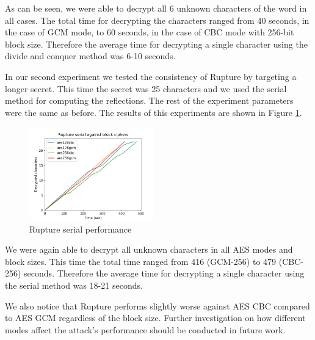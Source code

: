 As can be seen, we were able to decrypt all 6 unknown characters of the word in
all cases. The total time for decrypting the characters ranged from 40 seconds,
in the case of GCM mode, to 60 seconds, in the case of CBC mode with 256-bit
block size. Therefore the average time for decrypting a single character using
the divide and conquer method was 6-10 seconds.

In our second experiment we tested the consistency of Rupture by targeting a
longer secret. This time the secret was 25 characters and we used the
serial method for computing the reflections. The rest of the experiment
parameters were the same as before. The results of this experiments are shown in
Figure \ref{fig:rupture_performance_serial}.

   \begin{figure}[thpb]
      \centering
          \includegraphics[width=0.48\textwidth]{experiments/rupture_performance/rupture_serial_performance.png}
      \caption{Rupture serial performance}
      \label{fig:rupture_performance_serial}
   \end{figure}

We were again able to decrypt all unknown characters in all AES modes and block
sizes. This time the total time ranged from 416 (GCM-256) to 479 (CBC-256)
seconds. Therefore the average time for decrypting a single character using the
serial method was 18-21 seconds.

We also notice that Rupture performs slightly worse against AES CBC compared to
AES GCM regardless of the block size. Further investigation on how different
modes affect the attack's performance should be conducted in future work.
